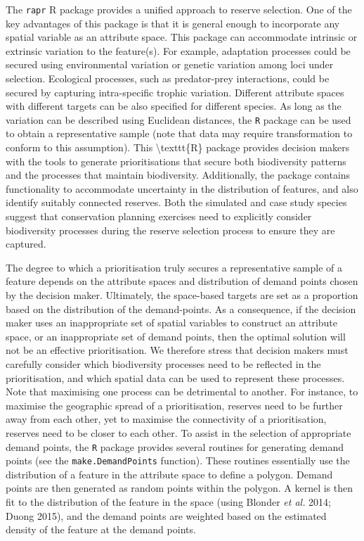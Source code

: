 \documentclass[11pt,]{article}
\begin{document}
The \texttt{rapr} R package provides a unified approach to reserve
selection. One of the key advantages of this package is that it is
general enough to incorporate any spatial variable as an attribute
space. This package can accommodate intrinsic or extrinsic variation to
the feature(s). For example, adaptation processes could be secured using
environmental variation or genetic variation among loci under selection.
Ecological processes, such as predator-prey interactions, could be
secured by capturing intra-specific trophic variation. Different
attribute spaces with different targets can be also specified for
different species. As long as the variation can be described using
Euclidean distances, the \texttt{R} package can be used to obtain a
representative sample (note that data may require transformation to
conform to this assumption). This \textbackslash{}texttt\{R\} package
provides decision makers with the tools to generate prioritisations that
secure both biodiversity patterns and the processes that maintain
biodiversity. Additionally, the package contains functionality to
accommodate uncertainty in the distribution of features, and also
identify suitably connected reserves. Both the simulated and case study
species suggest that conservation planning exercises need to explicitly
consider biodiversity processes during the reserve selection process to
ensure they are captured.

The degree to which a prioritisation truly secures a representative
sample of a feature depends on the attribute spaces and distribution of
demand points chosen by the decision maker. Ultimately, the space-based
targets are set as a proportion based on the distribution of the
demand-points. As a consequence, if the decision maker uses an
inappropriate set of spatial variables to construct an attribute space,
or an inappropriate set of demand points, then the optimal solution will
not be an effective prioritisation. We therefore stress that decision
makers must carefully consider which biodiversity processes need to be
reflected in the prioritisation, and which spatial data can be used to
represent these processes. Note that maximising one process can be
detrimental to another. For instance, to maximise the geographic spread
of a prioritisation, reserves need to be further away from each other,
yet to maximise the connectivity of a prioritisation, reserves need to
be closer to each other. To assist in the selection of appropriate
demand points, the \texttt{R} package provides several routines for
generating demand points (see the \texttt{make.DemandPoints} function).
These routines essentially use the distribution of a feature in the
attribute space to define a polygon. Demand points are then generated as
random points within the polygon. A kernel is then fit to the
distribution of the feature in the space (using Blonder \emph{et al.}
2014; Duong 2015), and the demand points are weighted based on the
estimated density of the feature at the demand points.
\end{document}
